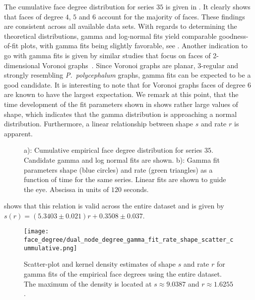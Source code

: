 		The cumulative face degree distribution for series $35$ is given in . It clearly shows that faces of degree $4$, $5$ and $6$ account for the majority of faces. These findings are consistent across all available data sets. With regards to determining the theoretical distributions, gamma and log-normal fits yield comparable goodness-of-fit plots, with gamma fits being slightly favorable, see . Another indication to go with gamma fits is given by similar studies that focus on faces of 2-dimensional Voronoi graphs~\cite{hinde1980monte,tanemura2003statistical}. Since Voronoi graphs are planar, $3$-regular and strongly resembling \emph{P.~polycephalum} graphs, gamma fits can be expected to be a good candidate. It is interesting to note that for Voronoi graphs faces of degree $6$ are known to have the largest expectation. We remark at this point, that the time development of the fit parameters shown in  shows rather large values of shape, which indicates that the gamma distribution is approaching a normal distribution. Furthermore, a linear relationship between shape $s$ and rate $r$ is apparent.
 
		\begin{figure}
			\centering

			\caption[Face degree distribution]{a): Cumulative empirical face degree distribution for series $35$. Candidate gamma and log normal fits are shown. b): Gamma fit parameters shape (blue circles) and rate (green triangles) as a function of time for the same series. Linear fits are shown to guide the eye. Abscissa in units of $120$ seconds.}
			\label{fig:face_degree_fit}
		\end{figure}

		 shows that this relation is valid across the entire dataset and is given by $s(r) = (5.3403 \pm 0.021) r + 0.3508 \pm 0.037$.
 
		\begin{figure}[!htbp]
			\centering
				\texttt{[image: face\_degree/dual\_node\_degree\_gamma\_fit\_rate\_shape\_scatter\_cummulative.png]}
			\caption[Face degree distribution fit parameter densities.]{Scatter-plot and kernel density estimates of shape $s$ and rate $r$ for gamma fits of the empirical face degrees using the entire dataset. The maximum of the density is located at $s \approx 9.0387$ and $r \approx 1.6255$.}
			\label{fig:face_degree_kde}
		\end{figure}

